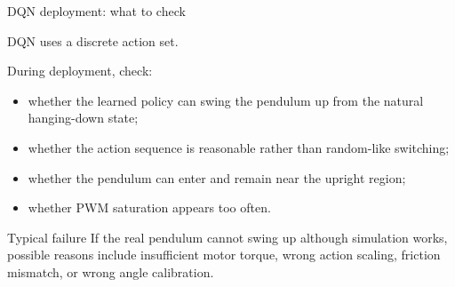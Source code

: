 \documentclass[aspectratio=169]{beamer}
\begin{document}
\begin{frame}{DQN deployment: what to check}

DQN uses a discrete action set.

\vspace{0.15cm}

During deployment, check:

\begin{itemize}
    \item whether the learned policy can swing the pendulum up from the natural hanging-down state;
    \vspace{0.18cm}

    \item whether the action sequence is reasonable rather than random-like switching;
    \vspace{0.18cm}

    \item whether the pendulum can enter and remain near the upright region;
    \vspace{0.18cm}

    \item whether PWM saturation appears too often.
\end{itemize}

\vspace{0.15cm}

\begin{alertblock}{Typical failure}
\small
If the real pendulum cannot swing up although simulation works, possible reasons include insufficient motor torque, wrong action scaling, friction mismatch, or wrong angle calibration.
\end{alertblock}

\end{frame}
\end{document}
